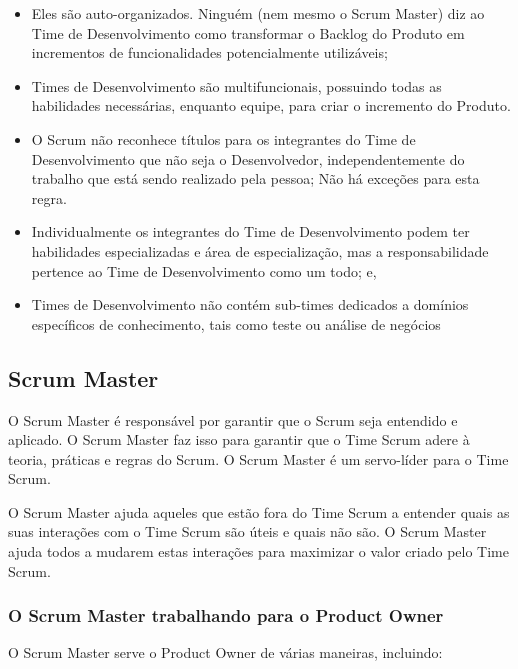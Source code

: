 \begin{itemize}

  \item Eles são auto-organizados. Ninguém (nem mesmo o Scrum Master) diz ao Time de
  Desenvolvimento como transformar o Backlog do Produto em incrementos de
  funcionalidades potencialmente utilizáveis;
\item Times de Desenvolvimento são multifuncionais, possuindo todas as habilidades necessárias,
  enquanto equipe, para criar o incremento do Produto.
\item O Scrum não reconhece títulos para os integrantes do Time de Desenvolvimento que não
  seja o Desenvolvedor, independentemente do trabalho que está sendo realizado pela
  pessoa; Não há exceções para esta regra.
\item  Individualmente os integrantes do Time de Desenvolvimento podem ter habilidades
  especializadas e área de especialização, mas a responsabilidade pertence ao Time de
  Desenvolvimento como um todo; e,
\item Times de Desenvolvimento não contém sub-times dedicados a domínios específicos de
  conhecimento, tais como teste ou análise de negócios
\end{itemize}


\subsection{Scrum Master}
\label{sub:Scrum Master}

O Scrum Master é responsável por garantir que o Scrum seja entendido e aplicado. O Scrum
Master faz isso para garantir que o Time Scrum adere à teoria, práticas e regras do Scrum. O
Scrum Master é um servo-líder para o Time Scrum.

O Scrum Master ajuda aqueles que estão fora do Time Scrum a entender quais as suas
interações com o Time Scrum são úteis e quais não são. O Scrum Master ajuda todos a
mudarem estas interações para maximizar o valor criado pelo Time Scrum.

\subsubsection{O Scrum Master trabalhando para o Product Owner}
\label{subs:O Scrum Master trabalhando para o Product Owner}

O Scrum Master serve o Product Owner de várias maneiras, incluindo:

